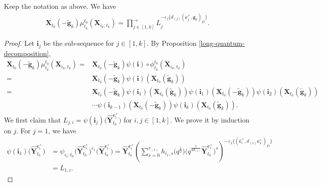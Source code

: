\begin{Lemma}\label{product_of_F_polynomial}
 Keep the notation as above. We have
 \begin{align}\label{eq:f-poly-well-def}
 \mathbf{X}_{t_{0}}(-\mathbf{\tilde{g}}_{k})\mu_{t_{k}}^{t_{0}}(\mathbf{X}_{i_{k};t_{k}})=\prod\limits^{\longrightarrow}_{j\in[1,k]}L_{j}^{-\varepsilon_{j}\{d_{(j)}(\mathbf{c}_{j}^{+},\mathbf{g}_{k})_D\}}.
 \end{align}

\end{Lemma}
\begin{proof}
 Let $\mathbf{i}_{j}$ be the sub-sequence  for $j\in [1,k]$.
 By Proposition \ref{long-quantum-decomposition},
 \begin{align*}
 \mathbf{X}_{t_{0}}(-\mathbf{\tilde{g}}_{k})\mu_{t_{k}}^{t_{0}}(\mathbf{X}_{i_{k};t_{k}})
 ={}&\mathbf{X}_{t_{0}}(-\mathbf{\tilde{g}}_{k})\psi(\mathbf{i})\circ\phi_{t_{k}}^{t_0}(\mathbf{X}_{i_{k};t_{k}})\\
 ={}&\mathbf{X}_{t_{0}}(-\mathbf{\tilde{g}}_{k})\psi(\mathbf{i})(\mathbf{X}_{t_{0}}(\mathbf{\tilde{g}}_{k}))\\
 ={}&\mathbf{X}_{t_{0}}(-\mathbf{\tilde{g}}_{k})\psi(\mathbf{i}_{1})(\mathbf{X}_{t_{0}}(\mathbf{\tilde{g}}_{k}))\psi(\mathbf{i}_{1})(\mathbf{X}_{t_{0}}(-\mathbf{\tilde{g}}_{k}))\psi(\mathbf{i}_{2})(\mathbf{X}_{t_{0}}(\mathbf{\tilde{g}}_{k}))\\
 &\cdots\psi(\mathbf{i}_{k-1})(\mathbf{X}_{t_{0}}(-\mathbf{\tilde{g}}_{k}))\psi(\mathbf{i}_{k})(\mathbf{X}_{t_{0}}(\mathbf{\tilde{g}}_{k})).
 \end{align*}
 We first claim that $L_{j,i}=\psi(\mathbf{i}_{j})\bigl(\mathbf{\hat{Y}}_{t_{0}}^{\mathbf{c}_{i}^{+}}\bigr)$
 for $i,j\in[1,k]$. We prove it by induction on $j$.
 For $j=1$, we have
 \begin{align*}
 \psi(\mathbf{i}_{1})\bigl(\mathbf{\hat{Y}}_{t_{0}}^{\mathbf{c}_{i}^{+}}\bigr)
 &=\psi_{i_{1}:t_{0}}\bigl(\mathbf{\hat{Y}}_{t_{0}}^{\mathbf{c}_{1}^{+}}\bigr)^{\varepsilon_{1}}\bigl(\mathbf{\hat{Y}}_{t_{0}}^{\mathbf{c}_{i}^{+}}\bigr)=\mathbf{\hat{Y}}_{t_{0}}^{\mathbf{c}_{i}^{+}}\left(\sum\limits^{r_{(1)}}_{s=0}h_{i_{1},s}\bigl(q^{\frac{1}{2}}\bigr)
 \bigl(q^{\frac{1}{2d_{(1)}}}\mathbf{\hat{Y}}_{t_{0}}^{\mathbf{c}_{1}^{+}}\bigr)^{s}\right)^{-\varepsilon_{1}\{(\mathbf{\hat{c}}_{i}^{+},d_{(1)}\mathbf{c}_{1}^{+})_{D}\}}\\
 &=L_{1,i}.
 \end{align*}

\end{proof}
